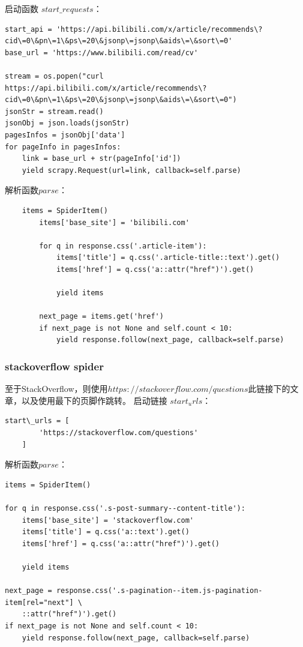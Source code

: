 \documentclass{article}
\begin{document}
\begin{CJK*}{UTF8}{gbsn}
启动函数 $start\_requests$：
\begin{lstlisting}
start_api = 'https://api.bilibili.com/x/article/recommends\?cid\=0\&pn\=1\&ps\=20\&jsonp\=jsonp\&aids\=\&sort\=0' 
base_url = 'https://www.bilibili.com/read/cv'

stream = os.popen("curl https://api.bilibili.com/x/article/recommends\?cid\=0\&pn\=1\&ps\=20\&jsonp\=jsonp\&aids\=\&sort\=0")
jsonStr = stream.read()
jsonObj = json.loads(jsonStr)
pagesInfos = jsonObj['data']
for pageInfo in pagesInfos:
    link = base_url + str(pageInfo['id'])
    yield scrapy.Request(url=link, callback=self.parse)
\end{lstlisting}
解析函数$parse$：
\begin{lstlisting}
	items = SpiderItem()
        items['base_site'] = 'bilibili.com'

        for q in response.css('.article-item'):
            items['title'] = q.css('.article-title::text').get()
            items['href'] = q.css('a::attr("href")').get()

            yield items

        next_page = items.get('href')
        if next_page is not None and self.count < 10:
            yield response.follow(next_page, callback=self.parse)
\end{lstlisting}


\subsubsection{stackoverflow spider}
至于StackOverflow，则使用$https://stackoverflow.com/questions$此链接下的文章，以及使用最下的页脚作跳转。
启动链接 $start_urls$：
\begin{lstlisting}
start\_urls = [
        'https://stackoverflow.com/questions'
    ]
\end{lstlisting}
解析函数$parse$：
\begin{lstlisting}
items = SpiderItem()

for q in response.css('.s-post-summary--content-title'):
    items['base_site'] = 'stackoverflow.com'
    items['title'] = q.css('a::text').get() 
    items['href'] = q.css('a::attr("href")').get()

    yield items
        
next_page = response.css('.s-pagination--item.js-pagination-item[rel="next"] \
	::attr("href")').get()
if next_page is not None and self.count < 10:
    yield response.follow(next_page, callback=self.parse)
\end{lstlisting}




\end{CJK*}
\end{document}
